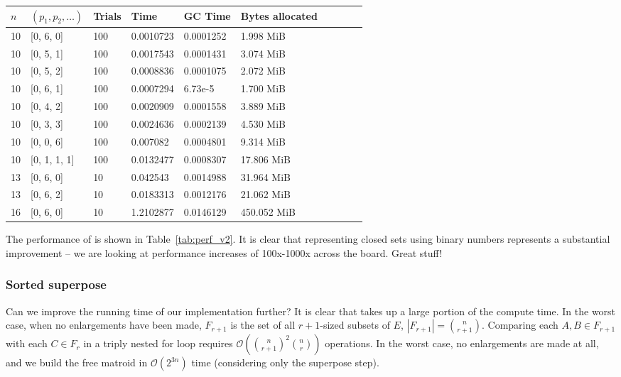 \begin{table*}[ht!]
  \centering
  \caption{Performance of $\texttt{random\_kmc\_v2}$.}
  \label{tab:perf_v2}
  \begin{threeparttable}
    \begin{tabular}{llllllllll}
      \toprule
      $n$ & $(p_1, p_2, \ldots)$ & Trials & Time  & GC Time & Bytes allocated \\
      \midrule
      10 & [0, 6, 0] & 100 & 0.0010723 & 0.0001252 & 1.998 MiB \\ 
      10 & [0, 5, 1] & 100 & 0.0017543 & 0.0001431 & 3.074 MiB \\ 
      10 & [0, 5, 2] & 100 & 0.0008836 & 0.0001075 & 2.072 MiB \\ 
      10 & [0, 6, 1] & 100 & 0.0007294 & 6.73e-5 & 1.700 MiB \\ 
      10 & [0, 4, 2] & 100 & 0.0020909 & 0.0001558 & 3.889 MiB \\ 
      10 & [0, 3, 3] & 100 & 0.0024636 & 0.0002139 & 4.530 MiB \\ 
      10 & [0, 0, 6] & 100 & 0.007082 & 0.0004801 & 9.314 MiB \\ 
      10 & [0, 1, 1, 1] & 100 & 0.0132477 & 0.0008307 & 17.806 MiB \\ 
      13 & [0, 6, 0] & 10 & 0.042543 & 0.0014988 & 31.964 MiB \\ 
      13 & [0, 6, 2] & 10 & 0.0183313 & 0.0012176 & 21.062 MiB \\ 
      16 & [0, 6, 0] & 10 & 1.2102877 & 0.0146129 & 450.052 MiB \\ 
      \bottomrule
    \end{tabular}
  \end{threeparttable}
\end{table*}

The performance of  is shown in Table~\ref{tab:perf_v2}. It is clear that representing closed sets using binary numbers represents a substantial improvement -- we are looking at performance increases of 100x-1000x across the board. Great stuff!


\subsubsection{Sorted superpose}
Can we improve the running time of our implementation further? It is clear that  takes up a large portion of the compute time. In the worst case, when no enlargements have been made, $F_{r+1}$ is the set of all $r+1$-sized subsets of $E$, $|F_{r+1}| = {\binom{n}{r+1}}$. Comparing each $A,B \in F_{r+1}$ with each $C \in F_r$ in a triply nested for loop requires $\mathcal{O}({\binom{n}{r+1}}^2{\binom{n}{r}})$ operations. In the worst case, no enlargements are made at all, and we build the free matroid in $\mathcal{O}(2^{3n})$ time (considering only the superpose step).

